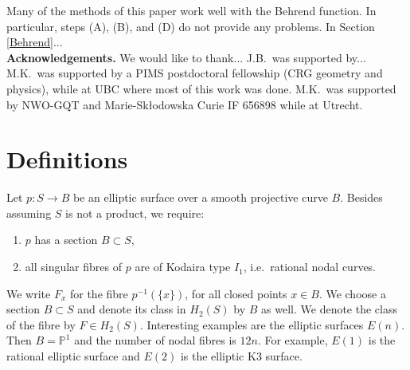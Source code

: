 \documentclass{amsart}
\theoremstyle{definition}
\newcommand{\PP} {\mathbb{P}}
\begin{document}
Many of the methods of this paper work well with the Behrend function. In particular, steps (A), (B), and (D) do not provide any problems. In Section \ref{Behrend}...  \\

\noindent \textbf{Acknowledgements.} We would like to thank... J.B.~was supported by... M.K.~was supported by a PIMS postdoctoral fellowship (CRG geometry and physics), while at UBC where most of this work was done. M.K.~was supported by NWO-GQT and Marie-Sk{\l}odowska Curie IF 656898 while at Utrecht. 


\section{Definitions}

Let $p : S \rightarrow B$ be an elliptic surface over a smooth projective curve $B$. Besides assuming $S$ is not a product, we require:
\begin{enumerate}
\item $p$ has a section $B \subset S$,
\item all singular fibres of $p$ are of Kodaira type $I_1$, i.e.~rational nodal curves. 
\end{enumerate}
We write $F_x$ for the fibre $p^{-1}(\{x\})$, for all closed points $x \in B$. We choose a section $B \subset S$ and denote its class in $H_2(S)$ by $B$ as well. We denote the class of the fibre by $F \in H_2(S)$. Interesting examples are the elliptic surfaces $E(n)$. Then $B = \PP^1$ and the number of nodal fibres is $12n$. For example, $E(1)$ is the rational elliptic surface and $E(2)$ is the elliptic K3 surface.
\end{document}

